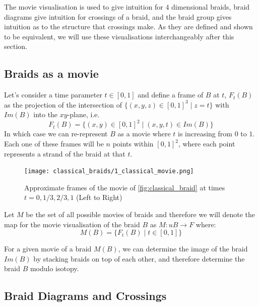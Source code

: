 The movie visualisation is used to give intuition for \( 4 \) dimensional braids, braid diagrams give intuition for crossings of a braid, and the braid group gives intuition as to the structure that crossings make. 
As they are defined and shown to be equivalent, we will use these visualisations interchangeably after this section. 

\subsection{Braids as a movie}

Let's consider a time parameter \( t \in [0, 1]\) and define a frame of \( B \) at \( t \), \( F_t(B) \) as the projection of the intersection of \( \{ (x, y, z) \in [0, 1]^3 \mid z = t \}  \) with \( Im(B) \) into the \( xy \)-plane, i.e. 
\[ F_t(B) = \{ (x, y) \in [0, 1]^2 \mid (x, y, t) \in Im(B) \} \]
In which case we can re-represent \( B \) as a movie where \( t \) is increasing from \( 0 \) to \( 1 \).  
Each one of these frames will be \( n \) points within \( [0, 1]^2 \), where each point represents a strand of the braid at that \( t \). 

\begin{figure}[H]
    \centering
    \texttt{[image: classical\_braids/1\_classical\_movie.png]}
    \caption{Approximate frames of the movie of \cref{fig:classical_braid} at times \( t = 0, 1 / 3, 2 / 3, 1 \) (Left to Right)}
    \label{fig:classical_movie}
\end{figure}

Let \( M \) be the set of all possible movies of braids and therefore we will denote the map for the movie visualisation of the braid \( B \) as \( M : uB \to F \) where:
\[ M(B) = \{ F_t(B) \mid t \in [0, 1] \} \]

\begin{Remark}
For a given movie of a braid \( M(B) \), we can determine the image of the braid \( Im(B) \) by stacking braids on top of each other, and therefore determine the braid \( B \) modulo isotopy.
\end{Remark}

\subsection{Braid Diagrams and Crossings}


